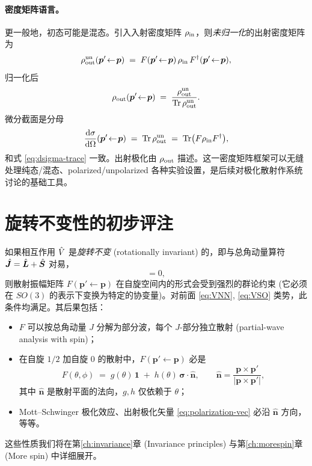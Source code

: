 \paragraph{密度矩阵语言。}更一般地，初态可能是混态。引入入射密度矩阵 $\rho_{\rm in}$，则\emph{未归一化}的出射密度矩阵为
\begin{equation}
  \rho_{\rm out}^{\rm un}(\bm p'\!\leftarrow\!\bm p)\;=\;F(\bm p'\!\leftarrow\!\bm p)\,\rho_{\rm in}\,F^\dagger(\bm p'\!\leftarrow\!\bm p),
  \label{eq:rho-out-un}
\end{equation}
归一化后
\begin{equation}
  \rho_{\rm out}(\bm p'\!\leftarrow\!\bm p)\;=\;\frac{\rho_{\rm out}^{\rm un}}{\operatorname{Tr}\rho_{\rm out}^{\rm un}}.
\end{equation}
微分截面是分母
\begin{equation}
  \frac{\mathrm{d}\sigma}{\mathrm{d}\Omega}(\bm p'\!\leftarrow\!\bm p)\;=\;\operatorname{Tr}\rho_{\rm out}^{\rm un}\;=\;\operatorname{Tr}\bigl(F\rho_{\rm in}F^\dagger\bigr),
  \label{eq:dsigma-rho}
\end{equation}
和式 \eqref{eq:dsigma-trace} 一致。出射极化由 $\rho_{\rm out}$ 描述。这一密度矩阵框架可以无缝处理纯态/混态、polarized/unpolarized 各种实验设置，是后续对极化散射作系统讨论的基础工具。

\section{旋转不变性的初步评注}\label{sec:rot-inv-pre}

如果相互作用 $\hat{V}$ 是\emph{旋转不变} (rotationally invariant) 的，即与总角动量算符 $\hat{\bm J}=\hat{\bm L}+\hat{\bm S}$ 对易，
\begin{equation}
  [\Op H,\Op{\bm J}]=0,
\end{equation}
则散射振幅矩阵 $F(\bm p'\!\leftarrow\!\bm p)$ 在自旋空间内的形式会受到强烈的群论约束 (它必须在 $SO(3)$ 的表示下变换为特定的协变量)。对前面 \eqref{eq:VNN}, \eqref{eq:VSO} 类势，此条件均满足。其后果包括：
\begin{itemize}
  \item $F$ 可以按总角动量 $J$ 分解为部分波，每个 $J$-部分独立散射 (partial-wave analysis with spin)；
  \item 在自旋 $1/2$ 加自旋 $0$ 的散射中，$F(\bm p'\!\leftarrow\!\bm p)$ 必是
  \begin{equation}
    F(\theta,\phi)\;=\;g(\theta)\,\mathbf 1\;+\;h(\theta)\,\bm \sigma\!\cdot\!\hat{\bm n},
    \qquad \hat{\bm n}=\frac{\bm p\times\bm p'}{|\bm p\times\bm p'|},
    \label{eq:F-12-0-rot}
  \end{equation}
  其中 $\hat{\bm n}$ 是散射平面的法向，$g,h$ 仅依赖于 $\theta$；
  \item Mott--Schwinger 极化效应、出射极化矢量 \eqref{eq:polarization-vec} 必沿 $\hat{\bm n}$ 方向，等等。
\end{itemize}
这些性质我们将在第\ref{ch:invariance}章 (Invariance principles) 与第\ref{ch:morespin}章 (More spin) 中详细展开。

